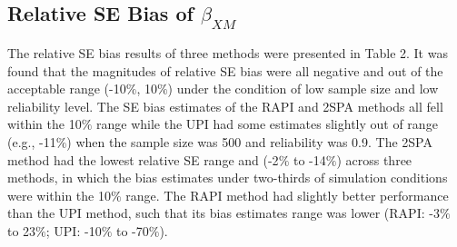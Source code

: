 \documentclass[
  man]{apa7}
\begin{document}
\hypertarget{relative-se-bias-of-beta_xm}{%
\subsection{\texorpdfstring{Relative SE Bias of \(\beta_{XM}\)}{Relative SE Bias of \textbackslash beta\_\{XM\}}}\label{relative-se-bias-of-beta_xm}}

The relative SE bias results of three methods were presented in Table 2. It was found that the magnitudes of relative SE bias were all negative and out of the acceptable range (-10\(\%\), 10\(\%\)) under the condition of low sample size and low reliability level. The SE bias estimates of the RAPI and 2SPA methods all fell within the 10\(\%\) range while the UPI had some estimates slightly out of range (e.g., -11\(\%\)) when the sample size was 500 and reliability was 0.9. The 2SPA method had the lowest relative SE range and (-2\(\%\) to -14\(\%\)) across three methods, in which the bias estimates under two-thirds of simulation conditions were within the 10\(\%\) range. The RAPI method had slightly better performance than the UPI method, such that its bias estimates range was lower (RAPI: -3\(\%\) to 23\(\%\); UPI: -10\(\%\) to -70\(\%\)).
\end{document}
